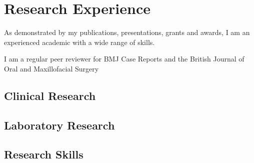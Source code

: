 \section*{Research Experience}

As demonstrated by my publications, presentations, grants and awards, I am an experienced academic with a wide range of skills.

I am a regular peer reviewer for BMJ Case Reports and the British Journal of Oral and Maxillofacial Surgery

\subsection*{Clinical Research}

\subsection*{Laboratory Research}

\subsection*{Research Skills}

